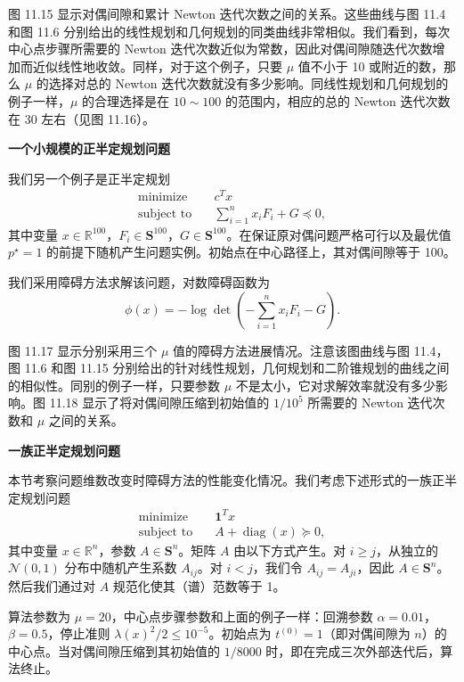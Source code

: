 \documentclass[UTF8,12pt,a4paper,fontset=fandol]{ctexart}
\begin{document}
图 11.15 显示对偶间隙和累计 Newton 迭代次数之间的关系。这些曲线与图 11.4 和图 11.6 分别给出的线性规划和几何规划的同类曲线非常相似。我们看到，每次中心点步骤所需要的 Newton 迭代次数近似为常数，因此对偶间隙随迭代次数增加而近似线性地收敛。同样，对于这个例子，只要 $\mu$ 值不小于 10 或附近的数，那么 $\mu$ 的选择对总的 Newton 迭代次数就没有多少影响。同线性规划和几何规划的例子一样，$\mu$ 的合理选择是在 $10\sim 100$ 的范围内，相应的总的 Newton 迭代次数在 30 左右（见图 11.16）。

\noindent\textbf{一个小规模的正半定规划问题}

我们另一个例子是正半定规划
\begin{equation}
\begin{aligned}
\text{minimize}\quad & c^Tx\\
\text{subject to}\quad & \sum_{i=1}^n x_iF_i+G\preceq 0,
\end{aligned}
\tag{11.46}
\end{equation}
其中变量 $x\in\mathbb{R}^{100}$，$F_i\in\mathbf{S}^{100}$，$G\in\mathbf{S}^{100}$。在保证原对偶问题严格可行以及最优值 $p^\star=1$ 的前提下随机产生问题实例。初始点在中心路径上，其对偶间隙等于 100。

我们采用障碍方法求解该问题，对数障碍函数为
\[
\phi(x)=-\log\det\left(-\sum_{i=1}^n x_iF_i-G\right).
\]

图 11.17 显示分别采用三个 $\mu$ 值的障碍方法进展情况。注意该图曲线与图 11.4，图 11.6 和图 11.15 分别给出的针对线性规划，几何规划和二阶锥规划的曲线之间的相似性。同别的例子一样，只要参数 $\mu$ 不是太小，它对求解效率就没有多少影响。图 11.18 显示了将对偶间隙压缩到初始值的 $1/10^5$ 所需要的 Newton 迭代次数和 $\mu$ 之间的关系。

\noindent\textbf{一族正半定规划问题}

本节考察问题维数改变时障碍方法的性能变化情况。我们考虑下述形式的一族正半定规划问题
\begin{equation}
\begin{aligned}
\text{minimize}\quad & \mathbf{1}^Tx\\
\text{subject to}\quad & A+\operatorname{diag}(x)\succeq 0,
\end{aligned}
\tag{11.47}
\end{equation}
其中变量 $x\in\mathbb{R}^n$，参数 $A\in\mathbf{S}^n$。矩阵 $A$ 由以下方式产生。对 $i\geq j$，从独立的 $\mathcal{N}(0,1)$ 分布中随机产生系数 $A_{ij}$。对 $i<j$，我们令 $A_{ij}=A_{ji}$，因此 $A\in\mathbf{S}^n$。然后我们通过对 $A$ 规范化使其（谱）范数等于 1。

算法参数为 $\mu=20$，中心点步骤参数和上面的例子一样：回溯参数 $\alpha=0.01$，$\beta=0.5$，停止准则 $\lambda(x)^2/2\leq 10^{-5}$。初始点为 $t^{(0)}=1$（即对偶间隙为 $n$）的中心点。当对偶间隙压缩到其初始值的 $1/8000$ 时，即在完成三次外部迭代后，算法终止。
\end{document}
